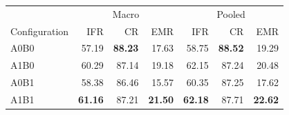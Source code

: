 \begin{tabular}{lrrrrrr}
\toprule
 & \multicolumn{3}{c}{Macro} & \multicolumn{3}{c}{Pooled} \\
Configuration & IFR & CR & EMR & IFR & CR & EMR \\
\midrule
A0B0 & 57.19 & \textbf{88.23} & 17.63 & 58.75 & \textbf{88.52} & 19.29 \\
A1B0 & 60.29 & 87.14 & 19.18 & 62.15 & 87.24 & 20.48 \\
A0B1 & 58.38 & 86.46 & 15.57 & 60.35 & 87.25 & 17.62 \\
A1B1 & \textbf{61.16} & 87.21 & \textbf{21.50} & \textbf{62.18} & 87.71 & \textbf{22.62} \\
\bottomrule
\end{tabular}
